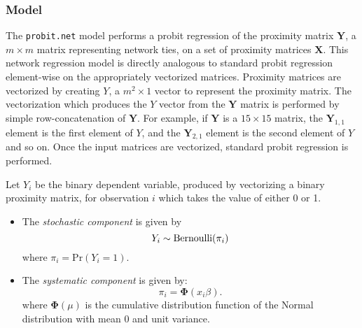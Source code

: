 \subsubsection{Model}
The {\tt probit.net} model performs a probit regression of the proximity matrix $\mathbf{Y}$, a $m \times m$ matrix representing network ties, on a set of proximity matrices $\mathbf{X}$. This network regression model is directly analogous to standard probit regression element-wise on the appropriately vectorized matrices. Proximity matrices are vectorized by creating $Y$, a $m^2 \times 1$ vector to represent the proximity matrix. The vectorization which produces the $Y$ vector from the $\mathbf{Y}$ matrix is performed by simple row-concatenation of $\mathbf{Y}$. For example, if $\mathbf{Y}$ is a $15 \times 15$ matrix, the $\mathbf{Y}_{1,1}$ element is the first element of $Y$, and the $\mathbf{Y}_{2,1}$ element is the second element of $Y$ and so on. Once the input matrices are vectorized, standard probit regression is performed. 

Let $Y_{i}$ be the binary dependent variable, produced by vectorizing a binary proximity matrix, for observation $i$ which takes the value of either 0 or 1.
\begin{itemize}
\item The \emph{stochastic component} is given by 
\begin{equation*}
Y_{i}  \sim \text{Bernoulli} ( \pi_{i})\\
\end{equation*}
where $\pi_{i} = \text{Pr}(Y_{i} = 1)$.
\item The \emph{systematic component} is given by:
\begin{equation*}
\pi_{i} = \pmb{\Phi}(x_{i}\beta).
\end{equation*}
where $ \pmb{\Phi}(\mu)$ is the cumulative distribution function of the Normal distribution with mean 0 and unit variance. 
\end{itemize}



